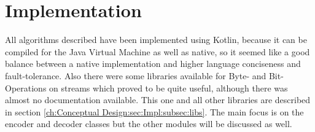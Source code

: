 \chapter{Implementation}
\label{ch:Implementation}
All algorithms described have been implemented using Kotlin, because it can be compiled for the Java Virtual Machine as well as native, so it seemed like a good balance between a native implementation and higher language conciseness and fault-tolerance. Also there were some libraries available for Byte- and Bit-Operations on streams which proved to be quite useful, although there was almost no documentation available. This one and all other libraries are described in section \ref{ch:Conceptual Design:sec:Impl:subsec:libs}. The main focus is on the encoder and decoder classes but the other modules will be discussed as well.

